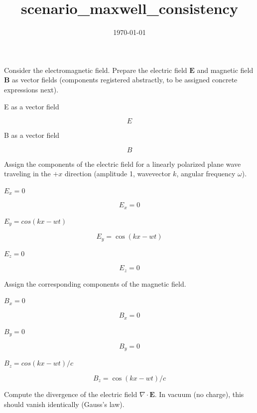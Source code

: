 \documentclass[dvipdfmx]{article}
\title{scenario\_maxwell\_consistency}
\date{\today}
\begin{document}
\maketitle

Consider the electromagnetic field. Prepare the electric field $\mathbf E$ and magnetic field $\mathbf B$ as vector fields (components registered abstractly, to be assigned concrete expressions next).

E as a vector field

\[
  E
\]

B as a vector field

\[
  B
\]

Assign the components of the electric field for a linearly polarized plane wave traveling in the $+x$ direction (amplitude 1, wavevector $k$, angular frequency $\omega$).

$E_x = 0$

\begin{equation}
  E_x = 0
  \label{eq:E1}
\end{equation}

$E_y = cos(k x - w t)$

\begin{equation}
  E_y = \cos(k x - w t)
  \label{eq:E2}
\end{equation}

$E_z = 0$

\begin{equation}
  E_z = 0
  \label{eq:E3}
\end{equation}

Assign the corresponding components of the magnetic field.

$B_x = 0$

\begin{equation}
  B_x = 0
  \label{eq:E4}
\end{equation}

$B_y = 0$

\begin{equation}
  B_y = 0
  \label{eq:E5}
\end{equation}

$B_z = cos(k x - w t)/c$

\begin{equation}
  B_z = \cos(k x - w t)/c
  \label{eq:E6}
\end{equation}

Compute the divergence of the electric field $\nabla\cdot\mathbf E$. In vacuum (no charge), this should vanish identically (Gauss's law).
\end{document}
